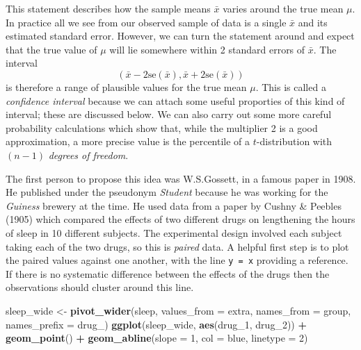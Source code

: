 \documentclass[
]{book}
\newenvironment{Shaded}{\begin{snugshade}}{\end{snugshade}}
\newcommand{\AttributeTok}[1]{\textcolor[rgb]{0.13,0.29,0.53}{#1}}
\newcommand{\DecValTok}[1]{\textcolor[rgb]{0.00,0.00,0.81}{#1}}
\newcommand{\FunctionTok}[1]{\textcolor[rgb]{0.13,0.29,0.53}{\textbf{#1}}}
\newcommand{\NormalTok}[1]{#1}
\newcommand{\OtherTok}[1]{\textcolor[rgb]{0.56,0.35,0.01}{#1}}
\newcommand{\SpecialCharTok}[1]{\textcolor[rgb]{0.81,0.36,0.00}{\textbf{#1}}}
\newcommand{\StringTok}[1]{\textcolor[rgb]{0.31,0.60,0.02}{#1}}
\begin{document}
This statement describes how the sample means \(\bar x\) varies around the true mean \(\mu\). In practice all we see from our observed sample of data is a single \(\bar x\) and its estimated standard error. However, we can turn the statement around and expect that the true value of \(\mu\) will lie somewhere within 2 standard errors of \(\bar x\). The interval
\[
      ( \bar{x} - 2 \mbox{se}(\bar x), \bar{x} + 2 \mbox{se}(\bar x) )
\]
is therefore a range of plausible values for the true mean \(\mu\). This is called a \emph{confidence interval} because we can attach some useful proporties of this kind of interval; these are discussed below. We can also carry out some more careful probability calculations which show that, while the multiplier 2 is a good approximation, a more precise value is the percentile of a \(t\)-distribution with \((n-1)\) \emph{degrees of freedom}.

The first person to propose this idea was W.S.Gossett, in a famous paper in 1908. He published under the pseudonym \emph{Student} because he was working for the \emph{Guiness} brewery at the time. He used data from a paper by Cushny \& Peebles (1905) which compared the effects of two different drugs on lengthening the hours of sleep in 10 different subjects. The experimental design involved each subject taking each of the two drugs, so this is \emph{paired} data. A helpful first step is to plot the paired values against one another, with the line \texttt{y\ =\ x} providing a reference. If there is no systematic difference between the effects of the drugs then the observations should cluster around this line.

\begin{Shaded}
\begin{Highlighting}[]
\NormalTok{sleep\_wide }\OtherTok{\textless{}{-}} \FunctionTok{pivot\_wider}\NormalTok{(sleep, }\AttributeTok{values\_from =}\NormalTok{ extra, }\AttributeTok{names\_from =}\NormalTok{ group,}
                          \AttributeTok{names\_prefix =} \StringTok{\textquotesingle{}drug\_\textquotesingle{}}\NormalTok{)}
\FunctionTok{ggplot}\NormalTok{(sleep\_wide, }\FunctionTok{aes}\NormalTok{(drug\_1, drug\_2)) }\SpecialCharTok{+} \FunctionTok{geom\_point}\NormalTok{() }\SpecialCharTok{+}
   \FunctionTok{geom\_abline}\NormalTok{(}\AttributeTok{slope =} \DecValTok{1}\NormalTok{, }\AttributeTok{col =} \StringTok{\textquotesingle{}blue\textquotesingle{}}\NormalTok{, }\AttributeTok{linetype =} \DecValTok{2}\NormalTok{)}
\end{Highlighting}
\end{Shaded}
\end{document}
